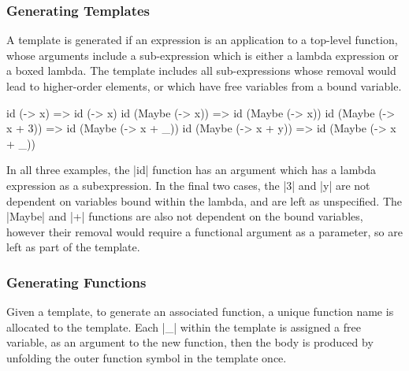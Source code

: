 \documentclass[preprint]{sigplanconf}
\begin{document}
\subsubsection{Generating Templates}

A template is generated if an expression is an application to a top-level function, whose arguments include a sub-expression which is either a lambda expression or a boxed lambda. The template includes all sub-expressions whose removal would lead to higher-order elements, or which have free variables from a bound variable.

\begin{example}
\begin{code}
id (\x -> x)              => id (\x -> x)
id (Maybe (\x -> x))      => id (Maybe (\x -> x))
id (Maybe (\x -> x + 3))  => id (Maybe (\x -> x + _))
id (Maybe (\x -> x + y))  => id (Maybe (\x -> x + _))
\end{code}

In all three examples, the |id| function has an argument which has a lambda expression as a subexpression. In the final two cases, the |3| and |y| are not dependent on variables bound within the lambda, and are left as unspecified.  The |Maybe| and |+| functions are also not dependent on the bound variables, however their removal would require a functional argument as a parameter, so are left as part of the template.
\end{example}

\subsubsection{Generating Functions}

Given a template, to generate an associated function, a unique function name is allocated to the template. Each |_| within the template is assigned a free variable, as an argument to the new function, then the body is produced by unfolding the outer function symbol in the template once.
\end{document}
